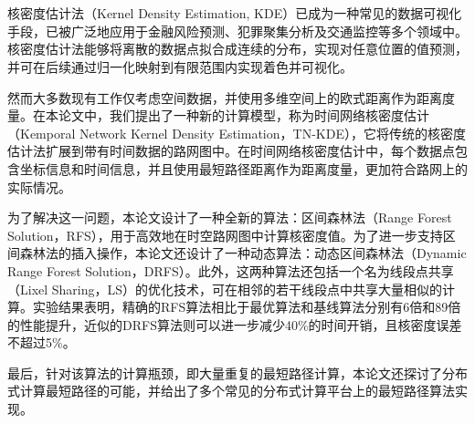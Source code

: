 \vspace{-2.5cm}
\chapter*{\xiaosan {}}
\hspace{-0.5cm}

核密度估计法（Kernel Density Estimation, KDE）已成为一种常见的数据可视化手段，已被广泛地应用于金融风险预测、犯罪聚集分析及交通监控等多个领域中。核密度估计法能够将离散的数据点拟合成连续的分布，实现对任意位置的值预测，并可在后续通过归一化映射到有限范围内实现着色并可视化。

然而大多数现有工作仅考虑空间数据，并使用多维空间上的欧式距离作为距离度量。在本论文中，我们提出了一种新的计算模型，称为时间网络核密度估计（Kemporal Network Kernel Density Estimation，TN-KDE），它将传统的核密度估计法扩展到带有时间数据的路网图中。在时间网络核密度估计中，每个数据点包含坐标信息和时间信息，并且使用最短路径距离作为距离度量，更加符合路网上的实际情况。

为了解决这一问题，本论文设计了一种全新的算法：区间森林法（Range Forest Solution，RFS），用于高效地在时空路网图中计算核密度值。为了进一步支持区间森林法的插入操作，本论文还设计了一种动态算法：动态区间森林法（Dynamic Range Forest Solution，DRFS）。此外，这两种算法还包括一个名为线段点共享（Lixel Sharing，LS）的优化技术，可在相邻的若干线段点中共享大量相似的计算。实验结果表明，精确的RFS算法相比于最优算法和基线算法分别有6倍和89倍的性能提升，近似的DRFS算法则可以进一步减少40\%的时间开销，且核密度误差不超过5\%。

最后，针对该算法的计算瓶颈，即大量重复的最短路径计算，本论文还探讨了分布式计算最短路径的可能，并给出了多个常见的分布式计算平台上的最短路径算法实现。


 
